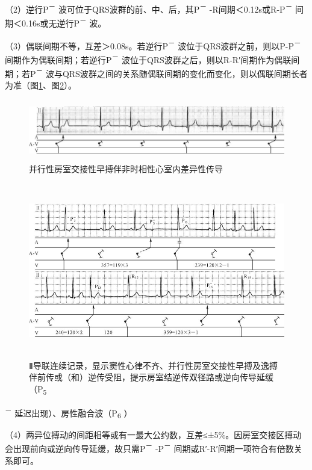 （2）逆行P\textsuperscript{－}
波可位于QRS波群的前、中、后，其P\textsuperscript{－}
-R间期＜0.12s或R-P\textsuperscript{－}
间期＜0.16s或无逆行P\textsuperscript{－} 波。

（3）偶联间期不等，互差＞0.08s。若逆行P\textsuperscript{－}
波位于QRS波群之前，则以P-P\textsuperscript{－}
间期作为偶联间期；若逆行P\textsuperscript{－}
波位于QRS波群之后，则以R-R′间期作为偶联间期；若P\textsuperscript{－}
波与QRS波群之间的关系随偶联间期的变化而变化，则以偶联间期长者为准（图\ref{fig16-7}、图\ref{fig16-8}）。

\begin{figure}[!htbp]
 \centering
 \includegraphics[width=5.77083in,height=1.05208in]{./images/Image00283.jpg}
 \captionsetup{justification=centering}
 \caption{并行性房室交接性早搏伴非时相性心室内差异性传导}
 \label{fig16-7}
  \end{figure} 

\begin{figure}[!htbp]
 \centering
 \includegraphics[width=5.71875in,height=3in]{./images/Image00284.jpg}
 \captionsetup{justification=centering}
 \caption{Ⅱ导联连续记录，显示窦性心律不齐、并行性房室交接性早搏及逸搏伴前传或（和）逆传受阻，提示房室结逆传双径路或逆向传导延缓（P\textsubscript{5}}
 \label{fig16-8}
  \end{figure} 
\textsuperscript{－} 延迟出现）、房性融合波（P\textsubscript{6} ）

（4）两异位搏动的间距相等或有一最大公约数，互差≤±5\%。因房室交接区搏动会出现前向或逆向传导延缓，故只需P\textsuperscript{－}
-P\textsuperscript{－} 间期或R′-R′间期一项符合有倍数关系即可。


